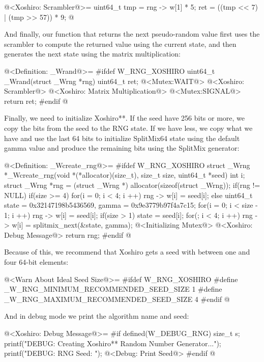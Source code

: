 \iniciocodigo
@<Xoshiro: Scrambler@>=
{
  uint64_t tmp = rng -> w[1] * 5;
  ret = ((tmp << 7) | (tmp >> 57)) * 9;
} 
@
\fimcodigo

And finally, our function that returns the next pseudo-random value
first uses the scrambler to compute the returned
value  using the current state, and then generates the
next state using the matrix multiplication:

\iniciocodigo
@<Definition: \_Wrand@>=
#ifdef W_RNG_XOSHIRO
uint64_t _Wrand(struct _Wrng *rng){
  uint64_t ret;
  @<Mutex:WAIT@>
  @<Xoshiro: Scrambler@>
  @<Xoshiro: Matrix Multiplication@>
  @<Mutex:SIGNAL@>
  return ret;
}
#endif
@
\fimcodigo

Finally, we need to initialize Xoshiro**. If the seed have 256 bits or
more, we copy the bits from the seed to the RNG state. If we have
less, we copy what we have and use the last 64 bits to initialize
SplitMix64 state using the default gamma value and produce the
remaining bits using the SplitMix generator:

\iniciocodigo
@<Definition: \_Wcreate\_rng@>=
#ifdef W_RNG_XOSHIRO
struct _Wrng *_Wcreate_rng(void *(*allocator)(size_t), size_t size,
                           uint64_t *seed){
  int i;
  struct _Wrng *rng = (struct _Wrng *) allocator(sizeof(struct _Wrng));
  if(rng != NULL){
    if(size >= 4){
      for(i = 0; i < 4; i ++)
        rng -> w[i] = seed[i];
    }
    else{
      uint64_t state = 0x32147198b5436569, gamma = 0x9e3779b97f4a7c15;
      for(i = 0; i < size - 1; i ++)
        rng -> w[i] = seed[i];
      if(size > 1)
        state = seed[i];
      for(; i < 4; i ++)
        rng -> w[i] = splitmix_next(&state, gamma);
    }                           
    @<Initializing Mutex@>
    @<Xoshiro: Debug Message@>
  }
  return rng;
}
#endif
@
\fimcodigo

Because of this, we recommend that Xoshiro gets a seed with between
one and four 64-bit elements:

\iniciocodigo
@<Warn About Ideal Seed Size@>=
#ifdef W_RNG_XOSHIRO
#define _W_RNG_MINIMUM_RECOMMENDED_SEED_SIZE  1
#define _W_RNG_MAXIMUM_RECOMMENDED_SEED_SIZE  4
#endif
@
\fimcodigo

And in debug mode we print the algorithm name and seed:

\iniciocodigo
@<Xoshiro: Debug Message@>=
#if defined(W_DEBUG_RNG)
{
  size_t s;
  printf("DEBUG: Creating Xoshiro** Random Number Generator...");
  printf("DEBUG: RNG Seed: ");
  @<Debug: Print Seed@>
}
#endif
@
\fimcodigo

